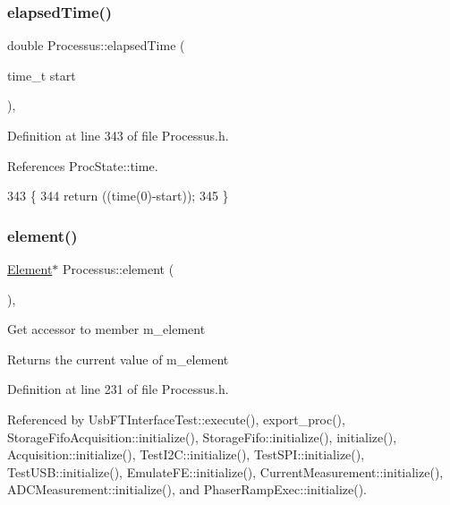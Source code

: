 \subsubsection{\texorpdfstring{elapsed\+Time()}{elapsedTime()}\hspace{0.1cm}{\footnotesize\ttfamily [2/2]}}
{\footnotesize\ttfamily double Processus\+::elapsed\+Time (\begin{DoxyParamCaption}\item[{time\+\_\+t}]{start }\end{DoxyParamCaption})\hspace{0.3cm}{\ttfamily [inline]}, {\ttfamily [inherited]}}



Definition at line 343 of file Processus.\+h.



References Proc\+State\+::time.


\begin{DoxyCode}
343                                    \{
344     \textcolor{keywordflow}{return} ((time(0)-start));
345   \}
\end{DoxyCode}
\mbox{\label{classProcessus_a6fe155527431a7190b7d44d600b9608d}} 
\subsubsection{\texorpdfstring{element()}{element()}}
{\footnotesize\ttfamily \hyperlink{classElement}{Element}$\ast$ Processus\+::element (\begin{DoxyParamCaption}{ }\end{DoxyParamCaption})\hspace{0.3cm}{\ttfamily [inline]}, {\ttfamily [inherited]}}

Get accessor to member m\+\_\+element \begin{DoxyReturn}{Returns}
the current value of m\+\_\+element 
\end{DoxyReturn}


Definition at line 231 of file Processus.\+h.



Referenced by Usb\+F\+T\+Interface\+Test\+::execute(), export\+\_\+proc(), Storage\+Fifo\+Acquisition\+::initialize(), Storage\+Fifo\+::initialize(), initialize(), Acquisition\+::initialize(), Test\+I2\+C\+::initialize(), Test\+S\+P\+I\+::initialize(), Test\+U\+S\+B\+::initialize(), Emulate\+F\+E\+::initialize(), Current\+Measurement\+::initialize(), A\+D\+C\+Measurement\+::initialize(), and Phaser\+Ramp\+Exec\+::initialize().


